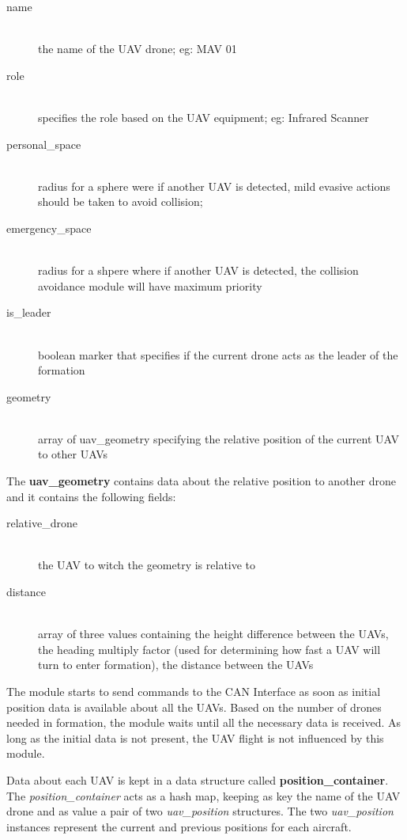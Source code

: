 \begin{description}
\item [name] \hfill \\ the name of the UAV drone; eg: MAV 01
\item [role] \hfill \\ specifies the role based on the UAV equipment; eg: Infrared Scanner
\item [personal_space] \hfill \\ radius for a sphere were if another UAV is detected, mild
evasive actions should be taken to avoid collision;
\item [emergency_space] \hfill \\ radius for a shpere where if another UAV is detected, 
the collision avoidance module will have maximum priority
\item [is_leader] \hfill \\ boolean marker that specifies if the current drone acts
as the leader of the formation
\item [geometry] \hfill \\ array of uav_geometry specifying the relative position of the 
current UAV to other UAVs
\end{description}

The \textbf{uav_geometry} contains data about the relative position to another drone and
it contains the following fields:

\begin{description}
\item [relative_drone] \hfill \\ the UAV to witch the geometry is relative to
\item [distance] \hfill \\ array of three values containing the height difference
between the UAVs, the heading multiply factor (used for determining how fast a UAV
will turn to enter formation), the distance between the UAVs
\end{description}

The module starts to send commands to the CAN Interface as soon as initial 
position data is available about all the UAVs. Based on the number of drones
needed in formation, the module waits until all the necessary data is received.
As long as the initial data is not present, the UAV flight is not influenced 
by this module.

Data about each UAV is kept in a data structure called \textbf{position_container}.
The \textit{position_container} acts as a hash map, keeping as key the name 
of the UAV drone and as value a pair of two \textit{uav_position} structures.
The two \textit{uav_position} instances represent the current and previous
positions for each aircraft.

